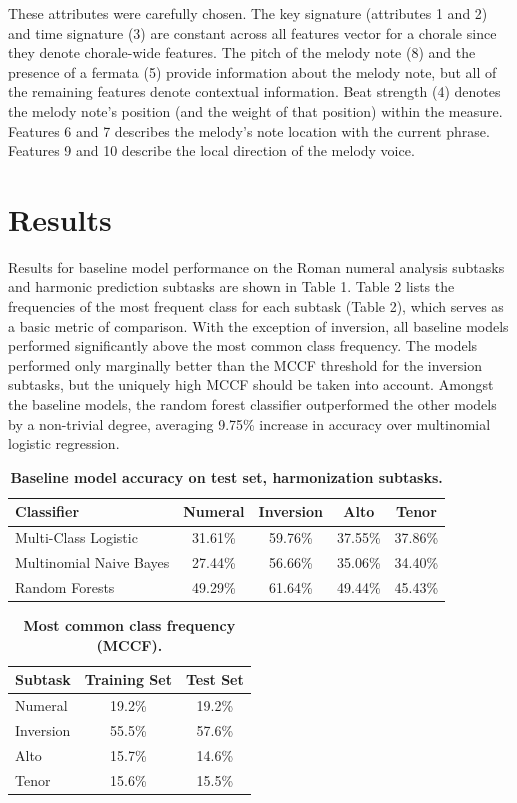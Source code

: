 \documentclass[11pt]{article}
\begin{document}
These attributes were carefully chosen. The key signature (attributes 1 and 2) and time signature (3) are constant across all features vector for a chorale since they denote chorale-wide features. The pitch of the melody note (8) and the presence of a fermata (5)  provide information about the melody note, but all of the remaining features denote contextual information. Beat strength (4) denotes the melody note's position (and the weight of that position) within the measure. Features 6 and 7 describes the melody's note location with the current phrase. Features 9 and 10 describe the local direction of the melody voice.

\section{Results}
Results for baseline model performance on the Roman numeral analysis subtasks and harmonic prediction subtasks are shown in Table 1. Table 2 lists the frequencies of the most frequent class for each subtask (Table 2), which serves as a basic metric of comparison. With the exception of inversion, all baseline models performed significantly above the most common class frequency. The models performed only marginally better than the MCCF threshold for the inversion subtasks, but the uniquely high MCCF should be taken into account. Amongst the baseline models, the random forest classifier outperformed the other models by a non-trivial degree, averaging 9.75\% increase in accuracy over multinomial logistic regression. 

\begin{table}[h]
\begin{center}
\caption[Table caption text]{\textbf{Baseline model accuracy on test set, harmonization subtasks.}}
\begin{tabular}{l | c c c c}
Classifier & Numeral & Inversion & Alto & Tenor \\ \hline
Multi-Class Logistic & 31.61\% & 59.76\% & 37.55\% & 37.86\% \\
Multinomial Naive Bayes & 27.44\% & 56.66\% & 35.06\% & 34.40\% \\
Random Forests & 49.29\% & 61.64\% & 49.44\% & 45.43\% \\
\end{tabular}
\end{center}
\end{table}

\begin{table}[h]
\begin{center}
\caption[Table caption text]{\textbf{Most common class frequency (MCCF).}}
\begin{tabular}{l | c c}
Subtask & Training Set & Test Set \\ \hline
Numeral & 19.2\% & 19.2\% \\
Inversion & 55.5\% & 57.6\% \\
Alto & 15.7\% & 14.6\% \\
Tenor & 15.6\% & 15.5\%
\end{tabular}
\end{center}
\end{table}
\end{document}
